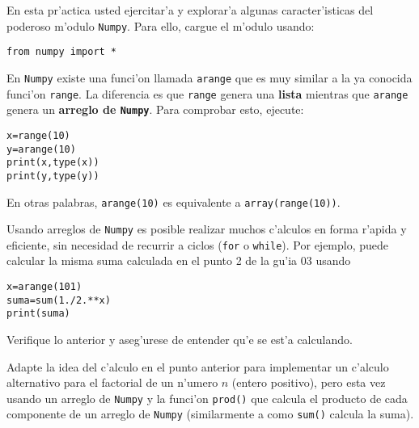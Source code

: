 \documentclass[11pt]{exam}
\begin{document}
\firstpageheadrule
\runningheadrule
{}
\cfoot{ }
\begin{flushleft}
\vspace{0.2in}
\vspace{0.25cm}
\end{flushleft}

\begin{questions}

\item En esta pr'actica usted ejercitar'a y explorar'a algunas caracter'isticas del poderoso m'odulo \texttt{Numpy}. Para ello, cargue el m'odulo usando:
\begin{verbatim}
from numpy import *
\end{verbatim}
\item En \texttt{Numpy} existe una funci'on llamada \texttt{arange} que es muy similar a la ya conocida funci'on \texttt{range}. La diferencia es que \texttt{range} genera una \textbf{lista} mientras que \texttt{arange} genera un \textbf{arreglo de \texttt{Numpy}}. Para comprobar esto, ejecute:
\begin{verbatim}
x=range(10)
y=arange(10)
print(x,type(x))
print(y,type(y))
\end{verbatim}
En otras palabras, \texttt{arange(10)} es equivalente a \texttt{array(range(10))}.

\item Usando arreglos de \texttt{Numpy} es posible realizar muchos c'alculos en forma r'apida y eficiente, sin necesidad de recurrir a ciclos (\texttt{for} o \texttt{while}). Por ejemplo, puede calcular la misma suma calculada en el punto 2 de la gu'ia 03 usando
\begin{verbatim}
x=arange(101)
suma=sum(1./2.**x)
print(suma)
\end{verbatim}
Verifique lo anterior y aseg'urese de entender qu'e se est'a calculando.

\item Adapte la idea del c'alculo en el punto anterior para implementar un c'alculo alternativo para el factorial de un n'umero $n$ (entero positivo), pero esta vez usando un arreglo de \texttt{Numpy} y la funci'on \texttt{prod()} que calcula el producto de cada componente de un arreglo de \texttt{Numpy} (similarmente a como \texttt{sum()} calcula la suma).


\end{questions}
\end{document}
